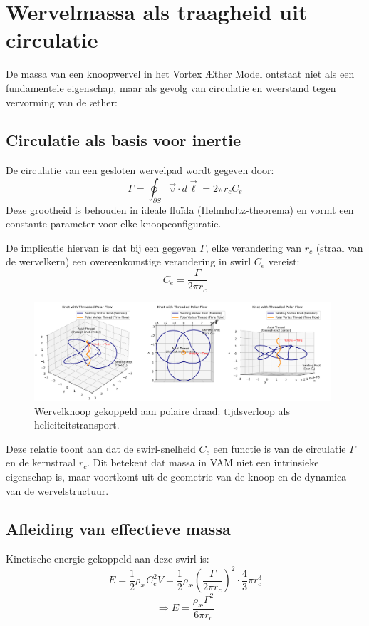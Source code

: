 \section{Wervelmassa als traagheid uit circulatie}

De massa van een knoopwervel in het Vortex Æther Model ontstaat niet als een fundamentele eigenschap, maar als gevolg van circulatie en weerstand tegen vervorming van de æther:

\subsection*{Circulatie als basis voor inertie}
De circulatie van een gesloten wervelpad wordt gegeven door:
\[
    \Gamma = \oint_{\partial S} \vec{v} \cdot d\vec{\ell} = 2\pi r_c C_e
\]
Deze grootheid is behouden in ideale fluïda (Helmholtz-theorema) en vormt een constante parameter voor elke knoopconfiguratie.

De implicatie hiervan is dat bij een gegeven $\Gamma$, elke verandering van $r_c$ (straal van de wervelkern) een overeenkomstige verandering in swirl $C_e$ vereist:
\[
    C_e = \frac{\Gamma}{2\pi r_c}
\]

\begin{figure}[h!]
    \centering
    \includegraphics[width=0.98\textwidth]{KnotThreadedPolarFlow.png}
    \caption{Wervelknoop gekoppeld aan polaire draad: tijdsverloop als heliciteitstransport.}
\end{figure}
Deze relatie toont aan dat de swirl-snelheid $C_e$ een functie is van de circulatie $\Gamma$ en de kernstraal $r_c$. Dit betekent dat massa in VAM niet een intrinsieke eigenschap is, maar voortkomt uit de geometrie van de knoop en de dynamica van de wervelstructuur.

\subsection*{Afleiding van effectieve massa}
Kinetische energie gekoppeld aan deze swirl is:
\[
    E = \frac{1}{2} \rho_\text{\ae} C_e^2 V = \frac{1}{2} \rho_\text{\ae} \left( \frac{\Gamma}{2\pi r_c} \right)^2 \cdot \frac{4}{3}\pi r_c^3
\]
\[
    \Rightarrow E = \frac{\rho_\text{\ae} \Gamma^2}{6\pi r_c}
\]

